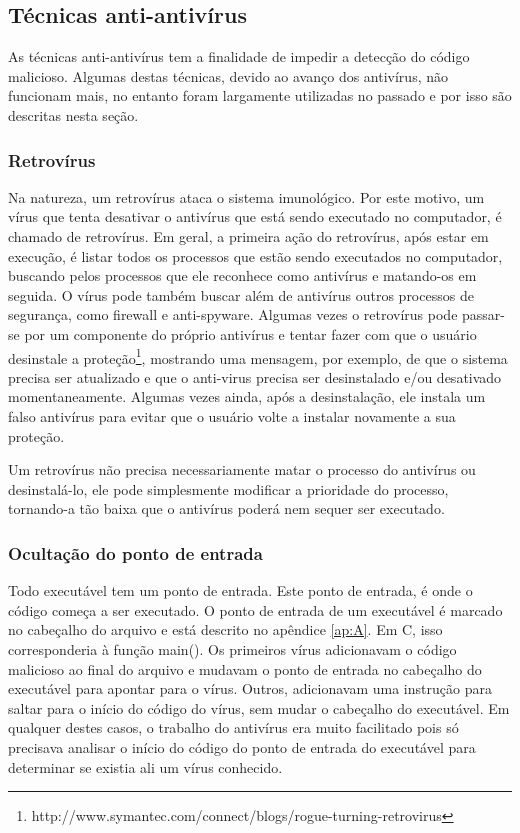\subsection{Técnicas anti-antivírus}
As técnicas anti-antivírus tem a finalidade de impedir a detecção do código malicioso. Algumas destas técnicas, devido ao avanço dos antivírus, não funcionam mais, no entanto foram largamente utilizadas no passado e por isso são descritas nesta seção.
\subsubsection{Retrovírus}
Na natureza, um retrovírus ataca o sistema imunológico. Por este motivo, um vírus que tenta desativar o antivírus que está sendo executado no computador, é chamado de retrovírus. Em geral, a primeira ação do retrovírus, após estar em execução, é listar todos os processos que estão sendo executados no computador, buscando pelos processos que ele reconhece como antivírus e matando-os em seguida. O vírus pode também buscar além de antivírus outros processos de segurança, como firewall e anti-spyware. Algumas vezes o retrovírus pode passar-se por um componente do próprio antivírus e tentar fazer com que o usuário desinstale a proteção\footnote{http://www.symantec.com/connect/blogs/rogue-turning-retrovirus}, mostrando uma mensagem, por exemplo, de que o sistema precisa ser atualizado e que o anti-virus precisa ser desinstalado e/ou desativado momentaneamente. Algumas vezes ainda, após a desinstalação, ele instala um falso antivírus para evitar que o usuário volte a instalar novamente a sua proteção.

Um retrovírus não precisa necessariamente matar o processo do antivírus ou desinstalá-lo, ele pode simplesmente modificar a prioridade do processo, tornando-a tão baixa que o antivírus poderá nem sequer ser executado.

\subsubsection{Ocultação do ponto de entrada}
Todo executável tem um ponto de entrada. Este ponto de entrada, é onde o código começa a ser executado. O ponto de entrada de um executável é marcado no cabeçalho do arquivo e está descrito no apêndice \ref{ap:A}. Em C, isso corresponderia à função main(). Os primeiros vírus adicionavam o código malicioso ao final do arquivo e mudavam o ponto de entrada no cabeçalho do executável para apontar para o vírus. Outros, adicionavam uma instrução para saltar para o início do código do vírus, sem mudar o cabeçalho do executável. Em qualquer destes casos, o trabalho do antivírus era muito facilitado pois só precisava analisar o início do código do ponto de entrada do executável para determinar se existia ali um vírus conhecido. 

